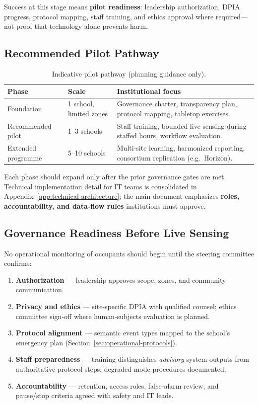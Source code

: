 Success at this stage means \textbf{pilot readiness}: leadership authorization, DPIA
progress, protocol mapping, staff training, and ethics approval where required---not
proof that technology alone prevents harm.

\subsection{Recommended Pilot Pathway}

\begin{table}[htbp]
  \centering
  \caption{Indicative pilot pathway (planning guidance only).}
  \label{tab:pilot-tiers-summary}
  \small
  \begin{tabular}{@{}p{2.8cm}p{3.6cm}p{5.6cm}@{}}
    \toprule
    Phase & Scale & Institutional focus \\
    \midrule
    Foundation &
      1 school, limited zones &
      Governance charter, transparency plan, protocol mapping, tabletop exercises. \\
    Recommended pilot &
      1--3 schools &
      Staff training, bounded live sensing during staffed hours, workflow evaluation. \\
    Extended programme &
      5--10 schools &
      Multi-site learning, harmonized reporting, consortium replication (e.g.\ Horizon). \\
    \bottomrule
  \end{tabular}
\end{table}

Each phase should expand only after the prior governance gates are met.
Technical implementation detail for IT teams is consolidated in
Appendix~\ref{app:technical-architecture}; the main document emphasizes \textbf{roles,
accountability, and data-flow rules} institutions must approve.

\subsection{Governance Readiness Before Live Sensing}

No operational monitoring of occupants should begin until the steering committee confirms:

\begin{enumerate}[noitemsep]
  \item \textbf{Authorization} --- leadership approves scope, zones, and community communication.
  \item \textbf{Privacy and ethics} --- site-specific DPIA with qualified counsel; ethics
        committee sign-off where human-subjects evaluation is planned.
  \item \textbf{Protocol alignment} --- semantic event types mapped to the school's emergency
        plan (Section~\ref{sec:operational-protocols}).
  \item \textbf{Staff preparedness} --- training distinguishes \emph{advisory} system outputs
        from authoritative protocol steps; degraded-mode procedures documented.
  \item \textbf{Accountability} --- retention, access roles, false-alarm review, and pause/stop
        criteria agreed with safety and IT leads.
\end{enumerate}

